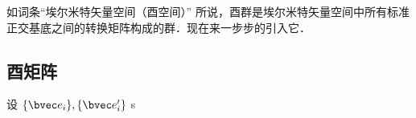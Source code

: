 
如词条“埃尔米特矢量空间（酉空间）” 所说，酉群是埃尔米特矢量空间中所有标准正交基底之间的转换矩阵构成的群．现在来一步步的引入它．
\subsection{酉矩阵}
设 $\{\bvec e_i\},\{\bvec e'_i\}$ s